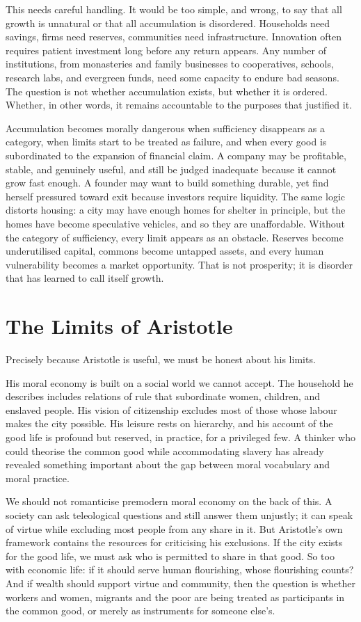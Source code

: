 \documentclass[11pt,a4paper,oneside]{book}
\begin{document}
This needs careful handling. It would be too simple, and wrong, to say that all growth is unnatural or that all accumulation is disordered. Households need savings, firms need reserves, communities need infrastructure. Innovation often requires patient investment long before any return appears. Any number of institutions, from monasteries and family businesses to cooperatives, schools, research labs, and evergreen funds, need some capacity to endure bad seasons. The question is not whether accumulation exists, but whether it is ordered. Whether, in other words, it remains accountable to the purposes that justified it.

Accumulation becomes morally dangerous when sufficiency disappears as a category, when limits start to be treated as failure, and when every good is subordinated to the expansion of financial claim. A company may be profitable, stable, and genuinely useful, and still be judged inadequate because it cannot grow fast enough. A founder may want to build something durable, yet find herself pressured toward exit because investors require liquidity. The same logic distorts housing: a city may have enough homes for shelter in principle, but the homes have become speculative vehicles, and so they are unaffordable. Without the category of sufficiency, every limit appears as an obstacle. Reserves become underutilised capital, commons become untapped assets, and every human vulnerability becomes a market opportunity. That is not prosperity; it is disorder that has learned to call itself growth.

\section*{The Limits of Aristotle}

Precisely because Aristotle is useful, we must be honest about his limits.

His moral economy is built on a social world we cannot accept. The household he describes includes relations of rule that subordinate women, children, and enslaved people. His vision of citizenship excludes most of those whose labour makes the city possible. His leisure rests on hierarchy, and his account of the good life is profound but reserved, in practice, for a privileged few. A thinker who could theorise the common good while accommodating slavery has already revealed something important about the gap between moral vocabulary and moral practice.

We should not romanticise premodern moral economy on the back of this. A society can ask teleological questions and still answer them unjustly; it can speak of virtue while excluding most people from any share in it. But Aristotle's own framework contains the resources for criticising his exclusions. If the city exists for the good life, we must ask who is permitted to share in that good. So too with economic life: if it should serve human flourishing, whose flourishing counts? And if wealth should support virtue and community, then the question is whether workers and women, migrants and the poor are being treated as participants in the common good, or merely as instruments for someone else's.
\end{document}
